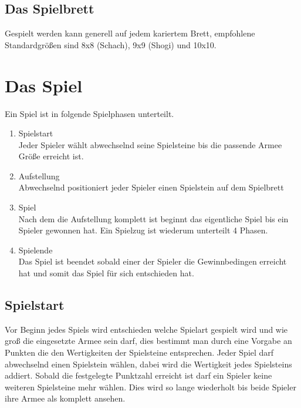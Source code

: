 \documentclass{article}
\begin{document}
	

\subsection{Das Spielbrett}
	Gespielt werden kann generell auf jedem kariertem Brett, empfohlene Standardgrößen sind
	8x8 (Schach), 9x9 (Shogi) und 10x10.
	

\section{Das Spiel}

	Ein Spiel ist in folgende Spielphasen unterteilt.

	\begin{enumerate}
	\item Spielstart \\
	 	  Jeder Spieler wählt abwechselnd seine Spielsteine bis die passende Armee Größe erreicht ist.
	\item Aufstellung \\
	  	  Abwechselnd positioniert jeder Spieler einen Spielstein auf dem Spielbrett
	\item Spiel \\
	  	  Nach dem die Aufstellung komplett ist beginnt das eigentliche Spiel bis ein Spieler gewonnen hat.
	  	  Ein Spielzug ist wiederum unterteilt 4 Phasen.
	\item Spielende \\
		  Das Spiel ist beendet sobald einer der Spieler die Gewinnbedingen erreicht hat und somit
		  das Spiel für sich entschieden hat.
	\end{enumerate}


\subsection{Spielstart}
	Vor Beginn jedes Spiels wird entschieden welche Spielart gespielt wird und wie groß die eingesetzte Armee sein darf,
	dies bestimmt man durch eine Vorgabe an Punkten die den Wertigkeiten der Spielsteine entsprechen.
	Jeder Spiel darf abwechselnd einen Spielstein wählen, dabei wird die Wertigkeit jedes Spielsteins addiert.
	Sobald die festgelegte Punktzahl erreicht ist darf ein Spieler keine weiteren Spielsteine mehr wählen.
	Dies wird so lange wiederholt bis beide Spieler ihre Armee als komplett ansehen.
\end{document}
